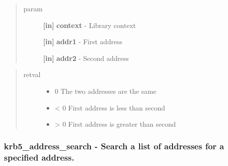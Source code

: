 \documentclass[letterpaper,10pt,english]{sphinxmanual}
\begin{document}
\begin{quote}\begin{description}
\item[{param}] \leavevmode
\textbf{{[}in{]}} \textbf{context} - Library context

\textbf{{[}in{]}} \textbf{addr1} - First address

\textbf{{[}in{]}} \textbf{addr2} - Second address

\end{description}\end{quote}
\begin{quote}\begin{description}
\item[{retval}] \leavevmode\begin{itemize}
\item {} 
0   The two addresses are the same

\item {} 
\textless{}   0 First address is less than second

\item {} 
\textgreater{}   0 First address is greater than second

\end{itemize}

\end{description}\end{quote}


\subsubsection{krb5\_address\_search -  Search a list of addresses for a specified address.}
\label{appdev/refs/api/krb5_address_search:krb5-address-search-search-a-list-of-addresses-for-a-specified-address}\label{appdev/refs/api/krb5_address_search::doc}

\begin{fulllineitems}
\label{appdev/refs/api/krb5_address_search:krb5_address_search}
\end{fulllineitems}
\end{document}
